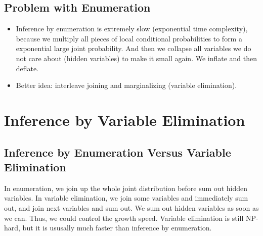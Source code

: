 \documentclass[11pt,a4paper]{report}
\begin{document}
\section{Problem with Enumeration}

\begin{itemize}
    \item Inference by enumeration is extremely slow (exponential time complexity), because we multiply all pieces of local conditional probabilities to form a exponential large joint probability. And then we collapse all variables we do not care about (hidden variables) to make it small again. We inflate and then deflate.
    \item Better idea: interleave joining and marginalizing (variable elimination).
\end{itemize}



\chapter{Inference by Variable Elimination}


\section{Inference by Enumeration Versus Variable Elimination}

In enumeration, we join up the whole joint distribution before sum out hidden variables. In variable elimination, we join some variables and immediately sum out, and join next variables and sum out. We sum out hidden variables as soon as we can. Thus, we could control the growth speed. Variable elimination is still NP-hard, but it is ususally much faster than inference by enumeration.
\end{document}
